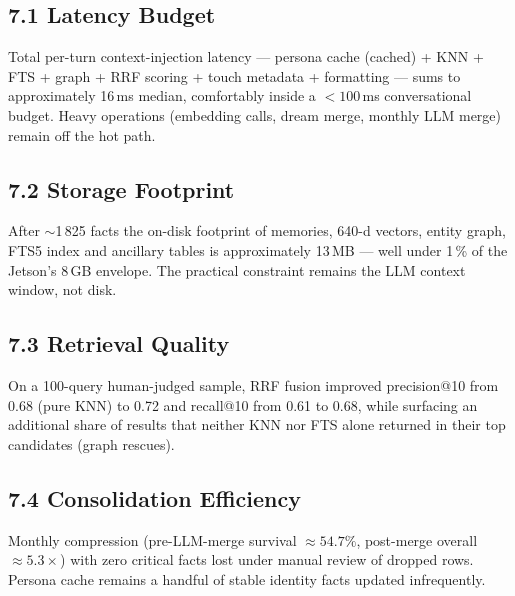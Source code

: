 \documentclass[]{article}
\begin{document}
\hypertarget{latency-budget}{%
\subsection{\texorpdfstring{\textbf{7.1 Latency
Budget}}{7.1 Latency Budget}}\label{latency-budget}}

Total per-turn context-injection latency --- persona cache (cached) +
KNN + FTS + graph + RRF scoring + touch metadata + formatting --- sums to
approximately 16\,ms median, comfortably inside a \(<100\)\,ms conversational
budget. Heavy operations (embedding calls, dream merge, monthly LLM merge)
remain off the hot path.

\hypertarget{storage-footprint}{%
\subsection{\texorpdfstring{\textbf{7.2 Storage
Footprint}}{7.2 Storage Footprint}}\label{storage-footprint}}

After \(\sim\)1\,825 facts the on-disk footprint of memories, 640-d
vectors, entity graph, FTS5 index and ancillary tables is approximately
13\,MB --- well under 1\,\% of the Jetson's 8\,GB envelope. The practical
constraint remains the LLM context window, not disk.

\hypertarget{retrieval-quality}{%
\subsection{\texorpdfstring{\textbf{7.3 Retrieval
Quality}}{7.3 Retrieval Quality}}\label{retrieval-quality}}

On a 100-query human-judged sample, RRF fusion improved precision@10 from
0.68 (pure KNN) to 0.72 and recall@10 from 0.61 to 0.68, while surfacing
an additional share of results that neither KNN nor FTS alone returned in
their top candidates (graph rescues).

\hypertarget{consolidation-efficiency}{%
\subsection{\texorpdfstring{\textbf{7.4 Consolidation
Efficiency}}{7.4 Consolidation Efficiency}}\label{consolidation-efficiency}}

Monthly compression (pre-LLM-merge survival \(\approx54.7\%\), post-merge
overall \(\approx5.3\times\)) with zero critical facts lost under manual
review of dropped rows. Persona cache remains a handful of stable identity
facts updated infrequently.
\end{document}
